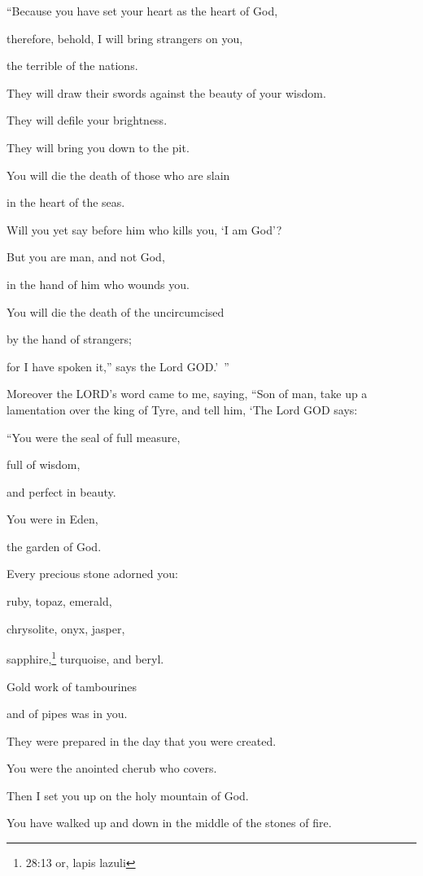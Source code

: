 “Because you have set your heart as the heart of God,

\myverse{}therefore, behold, I will bring strangers on you,

the terrible of the nations.

They will draw their swords against the beauty of your wisdom.

They will defile your brightness.

\myverse{}They will bring you down to the pit.

You will die the death of those who are slain

in the heart of the seas.

\myverse{}Will you yet say before him who kills you, ‘I am God’?

But you are man, and not God,

in the hand of him who wounds you.

\myverse{}You will die the death of the uncircumcised

by the hand of strangers;

for I have spoken it,” says the Lord GOD.’ ”


\vspace{\baselineskip} \myverse{}Moreover the LORD’s word came to me, saying,
\myverse{}“Son of man, take up a lamentation over the king of Tyre, and tell him, ‘The
Lord GOD says:

“You were the seal of full measure,

full of wisdom,

and perfect in beauty.

\myverse{}You were in Eden,

the garden of God.

Every precious stone adorned you:

ruby, topaz, emerald,

chrysolite, onyx, jasper,

sapphire,\footnote{28:13 or, lapis lazuli
} turquoise, and beryl.

Gold work of tambourines

and of pipes was in you.

They were prepared in the day that you were created.

\myverse{}You were the anointed cherub who covers.

Then I set you up on the holy mountain of God.

You have walked up and down in the middle of the stones of fire.

